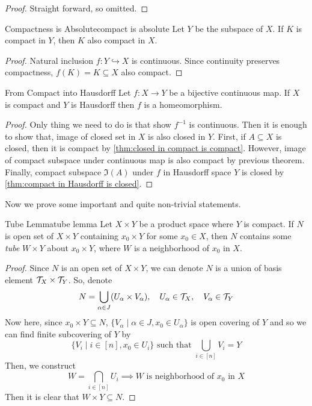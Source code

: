 \documentclass[12pt, a4paper, twoside]{article}
\theoremstyle{plain}
\begin{document}
\begin{proof}
    Straight forward, so omitted. 
\end{proof}

\begin{cor}{Compactness is Absolute}{compact is absolute}
    Let $Y$ be the subspace of $X$. If $K$ is compact in $Y$, then $K$ also compact in $X$. 
\end{cor}

\begin{proof}
    Natural inclusion $f: Y \hookrightarrow X$ is continuous. 
    Since continuity preserves compactness, $f(K) = K \subseteq X$ also compact. 
\end{proof}

\begin{thm}{From Compact into Hausdorff}{}
    Let $f: X \rightarrow Y$ be a bijective continuous map. If $X$ is compact and $Y$ is Hausdorff then $f$ is a homeomorphism. 
\end{thm}

\begin{proof}
    Only thing we need to do is that show $f^{-1}$ is continuous. 
    Then it is enough to show that, image of closed set in $X$ is also closed in $Y$. 
    First, if $A \subseteq X$ is closed, then it is compact by \ref{thm:closed in compact is compact}. 
    However, image of compact subspace under continuous map is also compact by previous theorem. 
    Finally, compact subspace $\Im(A)$ under $f$ in Hausdorff space $Y$ is closed by \ref{thm:compact in Hausdorff is closed}. 
\end{proof}

Now we prove some important and quite non-trivial statements. 

\begin{lem}{Tube Lemma}{tube lemma}
    Let $X \times Y$ be a product space where $Y$ is compact. 
    If $N$ is open set of $X \times Y$ containing $x_0 \times Y$ for some $x_0 \in X$, 
    then $N$ contains some \textit{tube} $W \times Y$ about $x_0 \times Y$, where $W$ is a neighborhood of $x_0$ in $X$. 
\end{lem}

\begin{proof}
    Since $N$ is an open set of $X \times Y$, we can denote $N$ is a union of basis element ${\mathcal {T}}_X \times {\mathcal {T}}_Y$. 
    So, denote 
    \[N = \bigcup_{\alpha \in J} (U_\alpha \times V_\alpha), \quad U_\alpha \in {\mathcal {T}}_X, \quad V_\alpha \in {\mathcal {T}}_Y\]
    Now here, since $x_0 \times Y \subseteq N$, $\{V_\alpha \mid \alpha \in J, x_0 \in U_\alpha \}$ 
    is open covering of $Y$ and so we can find finite subcovering of $Y$ by 
    \[\{V_i \mid i \in [n], x_0 \in U_i \} \text{ such that } \bigcup_{i \in [n]} V_i = Y\]
    Then, we construct 
    \[W = \bigcap_{i \in [n]} U_i \implies W \text{ is neighborhood of $x_0$ in $X$}\]
    Then it is clear that $W \times Y \subseteq N$. 
\end{proof}
\end{document}

